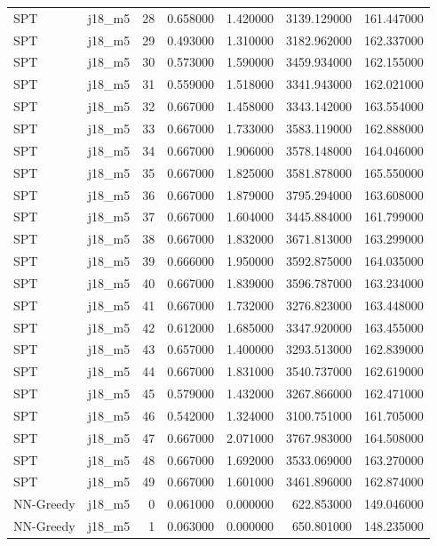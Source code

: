 \begin{tabular}{llrrrrr}
SPT & j18_m5 & 28 & 0.658000 & 1.420000 & 3139.129000 & 161.447000 \\
SPT & j18_m5 & 29 & 0.493000 & 1.310000 & 3182.962000 & 162.337000 \\
SPT & j18_m5 & 30 & 0.573000 & 1.590000 & 3459.934000 & 162.155000 \\
SPT & j18_m5 & 31 & 0.559000 & 1.518000 & 3341.943000 & 162.021000 \\
SPT & j18_m5 & 32 & 0.667000 & 1.458000 & 3343.142000 & 163.554000 \\
SPT & j18_m5 & 33 & 0.667000 & 1.733000 & 3583.119000 & 162.888000 \\
SPT & j18_m5 & 34 & 0.667000 & 1.906000 & 3578.148000 & 164.046000 \\
SPT & j18_m5 & 35 & 0.667000 & 1.825000 & 3581.878000 & 165.550000 \\
SPT & j18_m5 & 36 & 0.667000 & 1.879000 & 3795.294000 & 163.608000 \\
SPT & j18_m5 & 37 & 0.667000 & 1.604000 & 3445.884000 & 161.799000 \\
SPT & j18_m5 & 38 & 0.667000 & 1.832000 & 3671.813000 & 163.299000 \\
SPT & j18_m5 & 39 & 0.666000 & 1.950000 & 3592.875000 & 164.035000 \\
SPT & j18_m5 & 40 & 0.667000 & 1.839000 & 3596.787000 & 163.234000 \\
SPT & j18_m5 & 41 & 0.667000 & 1.732000 & 3276.823000 & 163.448000 \\
SPT & j18_m5 & 42 & 0.612000 & 1.685000 & 3347.920000 & 163.455000 \\
SPT & j18_m5 & 43 & 0.657000 & 1.400000 & 3293.513000 & 162.839000 \\
SPT & j18_m5 & 44 & 0.667000 & 1.831000 & 3540.737000 & 162.619000 \\
SPT & j18_m5 & 45 & 0.579000 & 1.432000 & 3267.866000 & 162.471000 \\
SPT & j18_m5 & 46 & 0.542000 & 1.324000 & 3100.751000 & 161.705000 \\
SPT & j18_m5 & 47 & 0.667000 & 2.071000 & 3767.983000 & 164.508000 \\
SPT & j18_m5 & 48 & 0.667000 & 1.692000 & 3533.069000 & 163.270000 \\
SPT & j18_m5 & 49 & 0.667000 & 1.601000 & 3461.896000 & 162.874000 \\
NN-Greedy & j18_m5 & 0 & 0.061000 & 0.000000 & 622.853000 & 149.046000 \\
NN-Greedy & j18_m5 & 1 & 0.063000 & 0.000000 & 650.801000 & 148.235000 \\

\end{tabular}
